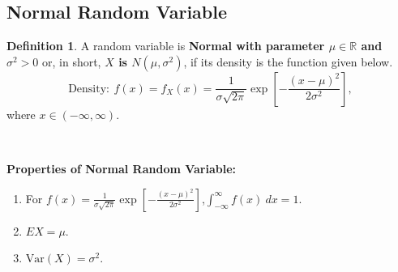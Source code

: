 \documentclass[12pt,a4paper]{article}
\theoremstyle{definition}
\theoremstyle{definition}
\newtheorem*{definition}{Definition}
\theoremstyle{definition}
\theoremstyle{definition}
\theoremstyle{remark}
\theoremstyle{definition}
\newcommand{\dispsty}{\displaystyle}
\newcommand{\Var}{\text{Var}}
\begin{document}
\subsection{Normal Random Variable}
\begin{tcolorbox}[colback=white]
	\begin{definition}
		A random variable is \textbf{Normal with parameter $\mu\in\mathbb{R}$ and $\sigma^2>0$} or, in short, \textbf{$X$ is $N(\mu,\sigma^2)$}, if its density is the function given below. \[
		\text{Density}:\ f(x)=f_X(x)=\frac{1}{\sigma\sqrt{2\pi}}\exp\left[-\frac{(x-\mu)^2}{2\sigma^2}\right],
		\] where $x\in(-\infty,\infty)$.
	\end{definition}
\end{tcolorbox} 
\
\begin{tcolorbox}[colback=white]
	\textbf{Properties of Normal Random Variable:}\begin{enumerate}
		\item For $f(x)=\dispsty\frac{1}{\sigma\sqrt{2\pi}}\exp\left[-\frac{(x-\mu)^2}{2\sigma^2}\right]$,\quad $
		\dispsty\int_{-\infty}^{\infty} f(x)\ dx=1.
		$
		\item $EX=\mu$.
		\item $\Var(X)=\sigma^2$.
	\end{enumerate}
\end{tcolorbox}
\
\end{document}
